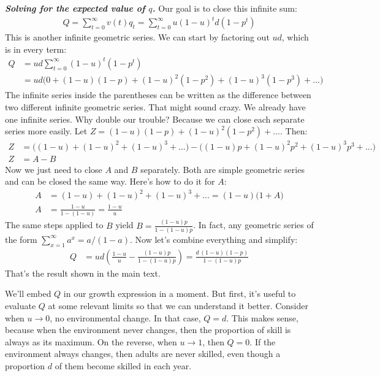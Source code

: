 \documentclass[10pt,reqno]{amsbook}
\numberwithin{equation}{chapter}
\newenvironment{mathbox}[2]
{\begin{table}[#1]
\justify\begin{tcolorbox}[enhanced, oversize]\footnotesize\noindent\textbf{\emph{#2}}}
{\end{tcolorbox}\end{table}}
\begin{document}
\begin{mathbox}{ptb}{Solving for the expected value of $q$.}
Our goal is to close this infinite sum:
\begin{align*}
	Q = \sum_{t=0}^\infty v(t) q_t = \sum_{t=0}^\infty u(1-u)^t d(1-p^t)
\end{align*}
This is another infinite geometric series. We can start by factoring out $ud$, which is in every term:
\begin{align*}
	Q &= ud \sum_{t=0}^\infty (1-u)^{t} (1-p^t) \\
	&= ud \big( 0 + (1-u)(1-p) + (1-u)^2 (1-p^2) + (1-u)^3 (1-p^3) + ... \big)
\end{align*}
The infinite series inside the parentheses can be written as the difference between two different infinite geometric series. That might sound crazy. We already have one infinite series. Why double our trouble? Because we can close each separate series more easily. Let $Z = (1-u)(1-p) + (1-u)^2 (1-p^2) + ...$. Then:
\begin{align*}
	Z &= \big( (1-u) + (1-u)^2 + (1-u)^3 + ... \big) - \big( (1-u)p + (1-u)^2 p^2 + (1-u)^3 p^3 + ... \big)\\
	Z &= A - B
\end{align*}
Now we just need to close $A$ and $B$ separately. Both are simple geometric series and can be closed the same way. Here's how to do it for $A$:
\begin{align*}
	A &= (1-u) + (1-u)^2 + (1-u)^3 + ... = (1-u) \big( 1 + A ) \\
	A &= \frac{1-u}{1-(1-u)} = \frac{1-u}{u}
\end{align*}
The same steps applied to $B$ yield $B = \frac{(1-u)p}{1-(1-u)p}$. In fact, any geometric series of the form $\sum_{x=1}^\infty a^x = a/(1-a)$. Now let's combine everything and simplify:
\begin{align*}
	Q &= ud \left( \frac{1-u}{u} - \frac{(1-u)p}{1-(1-u)p} \right) 
	= \frac{ d \, (1-u) (1-p) }{ 1 - (1-u)p }
\end{align*}
That's the result shown in the main text.
\end{mathbox}


We'll embed $Q$ in our growth expression in a moment. But first, it's useful to evaluate $Q$ at some relevant limits so that we can understand it better. Consider when $u \rightarrow 0$, no environmental change. In that case, $Q = d$. This makes sense, because when the environment never changes, then the proportion of skill is always as its maximum. On the reverse, when $u \rightarrow 1$, then $Q = 0$. If the environment always changes, then adults are never skilled, even though a proportion $d$ of them become skilled in each year. 
\end{document}
